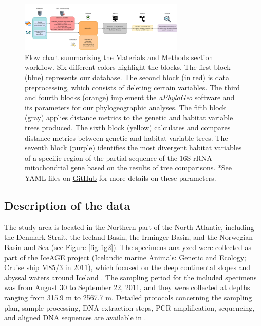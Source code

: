 \begin{figure}[htbp]
    \centering
    \includegraphics[width=0.7\textwidth]{diagram.drawio.png}
    \caption{Flow chart summarizing the Materials and Methods section workflow. Six different colors highlight the blocks. The first block (blue) represents our database. The second block (in red) is data preprocessing, which consists of deleting certain variables. The third and fourth blocks (orange) implement the \textit{aPhyloGeo} software and its parameters for our phylogeographic analyses. The fifth block (gray) applies distance metrics to the genetic and habitat variable trees produced. The sixth block (yellow) calculates and compares distance metrics between genetic and habitat variable trees. The seventh block (purple) identifies the most divergent habitat variables of a specific region of the partial sequence of the 16S rRNA mitochondrial gene based on the results of tree comparisons. *See YAML files on \href{https://github.com/tahiri-lab/aPhyloGeo}{GitHub} for more details on these parameters. \label{fig:fig1}}
\end{figure}

\subsection{Description of the data}
The study area is located in the Northern part of the North Atlantic, including the Denmark Strait, the Iceland Basin, the Irminger Basin, and the Norwegian Basin and Sea (see Figure \ref{fig:fig2}). The specimens analyzed were collected as part of the IceAGE project (Icelandic marine Animals: Genetic and Ecology; Cruise ship M85/3 in 2011), which focused on the deep continental slopes and abyssal waters around Iceland \citep{meisner_prefacebiodiversity_2018}. The sampling period for the included specimens was from August 30 to September 22, 2011, and they were collected at depths ranging from 315.9 m to 2567.7 m. Detailed protocols concerning the sampling plan, sample processing, DNA extraction steps, PCR amplification, sequencing, and aligned DNA sequences are available in \citep{uhlir_adding_2021}.

